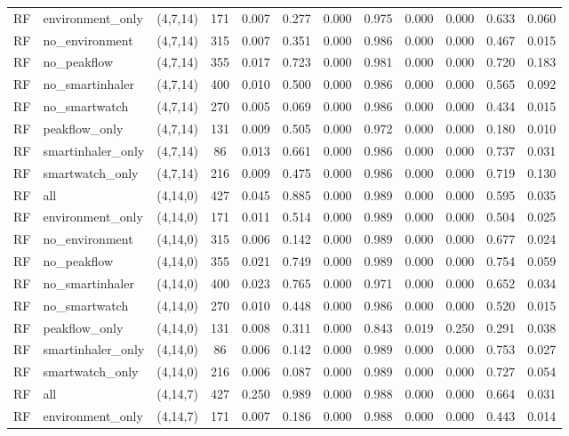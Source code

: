 \begin{longtable}{llcccccccccc}
RF & environment\_only & (4,7,14) & 171 & 0.007 & 0.277 & 0.000 & 0.975 & 0.000 & 0.000 & 0.633 & 0.060 \\
RF & no\_environment & (4,7,14) & 315 & 0.007 & 0.351 & 0.000 & 0.986 & 0.000 & 0.000 & 0.467 & 0.015 \\
RF & no\_peakflow & (4,7,14) & 355 & 0.017 & 0.723 & 0.000 & 0.981 & 0.000 & 0.000 & 0.720 & 0.183 \\
RF & no\_smartinhaler & (4,7,14) & 400 & 0.010 & 0.500 & 0.000 & 0.986 & 0.000 & 0.000 & 0.565 & 0.092 \\
RF & no\_smartwatch & (4,7,14) & 270 & 0.005 & 0.069 & 0.000 & 0.986 & 0.000 & 0.000 & 0.434 & 0.015 \\
RF & peakflow\_only & (4,7,14) & 131 & 0.009 & 0.505 & 0.000 & 0.972 & 0.000 & 0.000 & 0.180 & 0.010 \\
RF & smartinhaler\_only & (4,7,14) & 86 & 0.013 & 0.661 & 0.000 & 0.986 & 0.000 & 0.000 & 0.737 & 0.031 \\
RF & smartwatch\_only & (4,7,14) & 216 & 0.009 & 0.475 & 0.000 & 0.986 & 0.000 & 0.000 & 0.719 & 0.130 \\
RF & all & (4,14,0) & 427 & 0.045 & 0.885 & 0.000 & 0.989 & 0.000 & 0.000 & 0.595 & 0.035 \\
RF & environment\_only & (4,14,0) & 171 & 0.011 & 0.514 & 0.000 & 0.989 & 0.000 & 0.000 & 0.504 & 0.025 \\
RF & no\_environment & (4,14,0) & 315 & 0.006 & 0.142 & 0.000 & 0.989 & 0.000 & 0.000 & 0.677 & 0.024 \\
RF & no\_peakflow & (4,14,0) & 355 & 0.021 & 0.749 & 0.000 & 0.989 & 0.000 & 0.000 & 0.754 & 0.059 \\
RF & no\_smartinhaler & (4,14,0) & 400 & 0.023 & 0.765 & 0.000 & 0.971 & 0.000 & 0.000 & 0.652 & 0.034 \\
RF & no\_smartwatch & (4,14,0) & 270 & 0.010 & 0.448 & 0.000 & 0.986 & 0.000 & 0.000 & 0.520 & 0.015 \\
RF & peakflow\_only & (4,14,0) & 131 & 0.008 & 0.311 & 0.000 & 0.843 & 0.019 & 0.250 & 0.291 & 0.038 \\
RF & smartinhaler\_only & (4,14,0) & 86 & 0.006 & 0.142 & 0.000 & 0.989 & 0.000 & 0.000 & 0.753 & 0.027 \\
RF & smartwatch\_only & (4,14,0) & 216 & 0.006 & 0.087 & 0.000 & 0.989 & 0.000 & 0.000 & 0.727 & 0.054 \\
RF & all & (4,14,7) & 427 & 0.250 & 0.989 & 0.000 & 0.988 & 0.000 & 0.000 & 0.664 & 0.031 \\
RF & environment\_only & (4,14,7) & 171 & 0.007 & 0.186 & 0.000 & 0.988 & 0.000 & 0.000 & 0.443 & 0.014 \\

\end{longtable}
